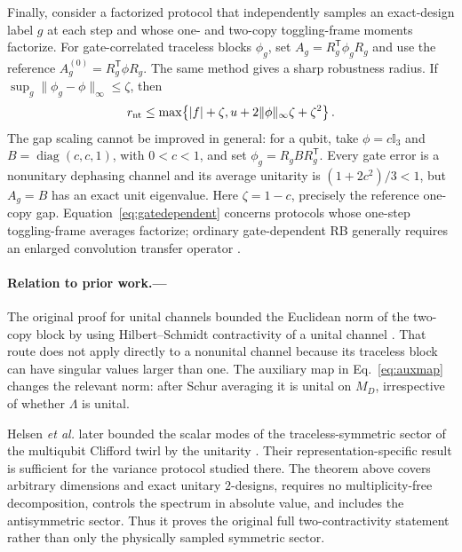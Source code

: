 \documentclass[aps,prl,reprint,superscriptaddress,nofootinbib]{revtex4-2}
\newcommand{\id}{\mathbb{I}}
\begin{document}
Finally, consider a factorized protocol that independently samples an
exact-design label $g$ at each step and whose one- and two-copy toggling-frame
moments factorize.  For gate-correlated traceless blocks $\phi_g$, set
$A_g=R_g^{\mathsf T}\phi_gR_g$ and use the reference
$A_g^{(0)}=R_g^{\mathsf T}\phi R_g$.  The same method gives a sharp robustness
radius.  If
$\sup_g\lVert\phi_g-\phi\rVert_\infty\leq\zeta$, then
\begin{align}
 r_{\rm nt}\leq
 \max\!\left\{|f|+\zeta,
 u+2\lVert\phi\rVert_\infty\zeta+\zeta^2\right\}.
 \label{eq:gatedependent}
\end{align}
The gap scaling cannot be improved in general: for a qubit, take
$\phi=c\id_3$ and $B=\operatorname{diag}(c,c,1)$, with $0<c<1$, and set
$\phi_g=R_gBR_g^{\mathsf T}$.  Every gate error is a nonunitary dephasing
channel and its average unitarity is $(1+2c^2)/3<1$, but $A_g=B$ has an exact
unit eigenvalue.  Here $\zeta=1-c$, precisely the reference one-copy gap.
Equation~\eqref{eq:gatedependent} concerns protocols whose one-step
toggling-frame averages factorize; ordinary gate-dependent RB generally
requires an enlarged convolution transfer operator
\cite{Wallman2018,MerkelEtAl2021}.

\paragraph{Relation to prior work.---}
The original proof for unital channels bounded the Euclidean norm of the
two-copy block by using Hilbert--Schmidt contractivity of a unital channel
\cite{WallmanFlammia2014}.  That route does not apply directly to a nonunital
channel because its traceless block can have singular values larger than one.
The auxiliary map in Eq.~\eqref{eq:auxmap} changes the relevant norm: after
Schur averaging it is unital on $M_D$, irrespective of whether $\Lambda$ is
unital.

Helsen \emph{et al.} later bounded the scalar modes of the traceless-symmetric
sector of the multiqubit Clifford twirl by the unitarity
\cite{HelsenEtAl2019}.  Their representation-specific result is sufficient for
the variance protocol studied there.  The theorem above covers arbitrary
dimensions and exact unitary $2$-designs, requires no multiplicity-free
decomposition, controls the spectrum in absolute value, and includes the
antisymmetric sector.  Thus it proves the original full two-contractivity
statement rather than only the physically sampled symmetric sector.
\end{document}
